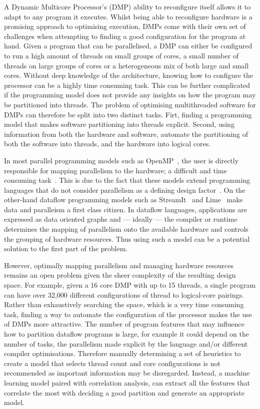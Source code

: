 A Dynamic Multicore Processor's (DMP) ability to reconfigure itself allows it to adapt to any program it executes.
Whilst being able to reconfigure hardware is a promising approach to optimising execution, DMPs come with their own set of challenges when attempting to finding a good configuration for the program at hand.
Given a program that can be parallelised, a DMP can either be configured to run a high amount of threads on small groups of cores, a small number of threads on large groups of cores or a heterogeneous mix of both large and small cores.
Without deep knowledge of the architecture, knowing how to configure the processor can be a highly time consuming task.
This can be further complicated if the programming model does not provide any insights on how the program may be partitioned into threads.
The problem of optimising multithreaded software for DMPs can therefore be split into two distinct tasks.
Firt, finding a programming model that makes software partitioning into threads explicit.
Second, using information from both the hardware and software, automate the partitioning of both the software into threads, and the hardware into logical cores.

In most parallel programming models such as OpenMP~\cite{openmp}, the user is directly responsible for mapping parallelism to the hardware; a difficult and time consuming task~\cite{prabhu2011LanguagePar}.
This is due to the fact that these models extend programming languages that do not consider parallelism as a defining design factor~\cite{pingaliTao2011}.
On the other-hand dataflow programming models such as StreamIt~\cite{theis2002streamit} and Lime~\cite{auerbach2012lime} make data and paralleism a first class citizen.
In dataflow languages, applications are expressed as data oriented graphs and --- ideally --- the compiler or runtime determines the mapping of parallelism onto the available hardware and controls the grouping of hardware resources.
Thus using such a model can be a potential solution to the first part of the problem.

However, optimally mapping parallelism and managing hardware resources remains an open problem given the sheer complexity of the resulting design space.
For example, given a 16 core DMP with up to 15 threads, a single program can have over 32,000 different configurations of thread to logical-core pairings.
Rather than exhaustively searching the space, which is a very time consuming task, finding a way to automate the configuration of the processor makes the use of DMPs more attractive.
The number of program features that may influence how to partition dataflow programs is large, for example it could depend on the number of tasks, the parallelism made explicit by the language and/or different compiler optimisations.
Therefore manually determining a set of heuristics to create a model that selects thread count and core configurations is not recommended as important information may be disregarded.
Instead, a machine learning model paired with correlation analysis, can extract all the features that correlate the most with deciding a good partition and generate an appropriate model.

